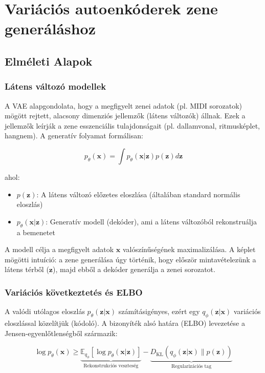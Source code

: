 \chapter{Variációs autoenkóderek zene generáláshoz}
\label{chap:vae}

\section{Elméleti Alapok}
\subsection{Látens változó modellek}
A VAE alapgondolata, hogy a megfigyelt zenei adatok (pl. MIDI sorozatok) mögött rejtett, alacsony dimenziós jellemzők (látens változók) állnak. Ezek a jellemzők leírják a zene esszenciális tulajdonságait (pl. dallamvonal, ritmusképlet, hangnem). A generatív folyamat formálisan:

\[
p_\theta(\mathbf{x}) = \int p_\theta(\mathbf{x}|\mathbf{z})p(\mathbf{z})d\mathbf{z}
\]

ahol:
\begin{itemize}
    \item $p(\mathbf{z})$: A látens változó előzetes eloszlása (általában standard normális eloszlás)
    \item $p_\theta(\mathbf{x}|\mathbf{z})$: Generatív modell (dekóder), ami a látens változóból rekonstruálja a bemenetet
\end{itemize}

A modell célja a megfigyelt adatok $\mathbf{x}$ valószínűségének maximalizálása. A képlet mögötti intuíció: a zene generálása úgy történik, hogy először mintavételezünk a látens térből ($\mathbf{z}$), majd ebből a dekóder generálja a zenei sorozatot.

\subsection{Variációs következtetés és ELBO}
A valódi utólagos eloszlás $p_\theta(\mathbf{z}|\mathbf{x})$ számításigényes, ezért egy $q_\phi(\mathbf{z}|\mathbf{x})$ variációs eloszlással közelítjük (kódoló). A bizonyíték alsó határa (ELBO) levezetése a Jensen-egyenlőtlenségből származik:

\[
\log p_\theta(\mathbf{x}) \geq \underbrace{\mathbb{E}_{q_\phi}[\log p_\theta(\mathbf{x}|\mathbf{z})]}_{\text{Rekonstrukciós veszteség}} - \underbrace{D_{\text{KL}}(q_\phi(\mathbf{z}|\mathbf{x}) \parallel p(\mathbf{z}))}_{\text{Regularizációs tag}}
\]

